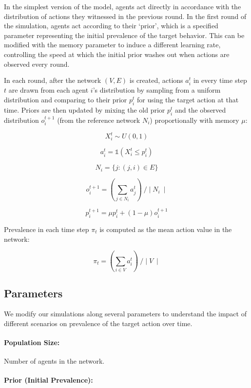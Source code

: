 \documentclass[11pt]{article}
\begin{document}
In the simplest version of the model, agents act directly in accordance
with the distribution of actions they witnessed in the previous round.
In the first round of the simulation, agents act according to their
`prior', which is a specified parameter representing the initial
prevalence of the target behavior. This can be modified with the memory
parameter to induce a different learning rate, controlling the speed at
which the initial prior washes out when actions are observed every
round.

In each round, after the network \((V, E)\) is created, actions
\(a_i^t\) in every time step \(t\) are drawn from each agent \(i\)'s
distribution by sampling from a uniform distribution and comparing to
their prior \(p_i^t\) for using the target action at that time. Priors
are then updated by mixing the old prior \(p_i^t\) and the observed
distribution \(o_i^{t+1}\) (from the reference network \(N_i\))
proportionally with memory \(\mu\):

\[X_i^t \sim U(0,1)\]

\[a_i^t = \mathbb{1}(X_i^t \leq p_i^t)\]

\[N_i = \{j : (j, i) \in E\}\]

\[o_i^{t+1} = (\sum_{j \in N_i} a_j^t) ~ / \mid N_i ~ \mid \]

\[p_i^{t+1} = \mu p_i^t + (1 - \mu) o_i^{t+1} \]

Prevalence in each time step \(\pi_t\) is computed as the mean action
value in the network:

\[\pi_t = (\sum_{i \in V} a_i^t)~ / \mid V ~ \mid \]

\hypertarget{parameters}{%
\subsection{Parameters}\label{parameters}}

We modify our simulations along several parameters to understand the
impact of different scenarios on prevalence of the target action over
time.

\hypertarget{population-size}{%
\paragraph{Population Size:}\label{population-size}}

Number of agents in the network.

\hypertarget{prior-initial-prevalence}{%
\paragraph{Prior (Initial Prevalence):}\label{prior-initial-prevalence}}
\end{document}
